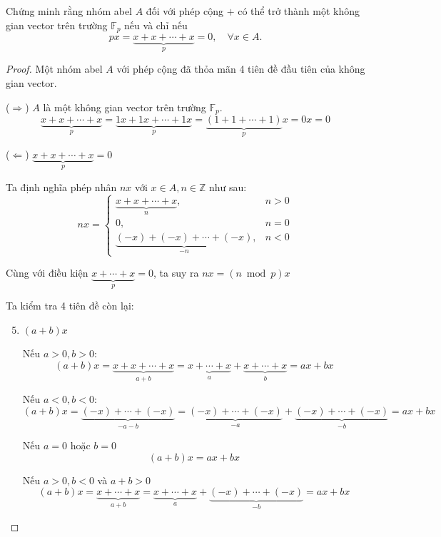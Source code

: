 \documentclass[class=linear-algebra,crop=false]{standalone}
\begin{document}
\begin{exercise}Chứng minh rằng nhóm abel $A$ đối với phép cộng $+$ có thể trở thành một không gian vector trên trường $\mathbb{F}_{p}$ nếu và chỉ nếu
    \[ px = \underbrace{x + x + \cdots + x}_{p} = 0,\quad \forall x\in A. \]
\end{exercise}

\begin{proof}Một nhóm abel $A$ với phép cộng đã thỏa mãn 4 tiên đề đầu tiên của không gian vector.
    \par($\Rightarrow$) $A$ là một không gian vector trên trường $\mathbb{F}_{p}$.
    \[ \underbrace{x + x + \cdots + x}_{p} = \underbrace{1x + 1x + \cdots + 1x}_{p} = \underbrace{(1 + 1 + \cdots + 1)}_{p}x = 0x = 0 \]
    \par($\Leftarrow$) $\underbrace{x + x + \cdots + x}_{p} = 0$
    \par Ta định nghĩa phép nhân $nx$ với $x\in A, n\in\mathbb{Z}$ như sau:
    \[
        nx =
        \begin{cases}
            \underbrace{x + x + \cdots + x}_{n},           & n > 0 \\
            0,                                             & n = 0 \\
            \underbrace{(-x) + (-x) + \cdots + (-x)}_{-n}, & n < 0
        \end{cases}
    \]
    \par Cùng với điều kiện $\underbrace{x + \cdots + x}_{p} = 0$, ta suy ra $nx = (n\bmod{p})x$
    \par Ta kiểm tra 4 tiên đề còn lại:
    \begin{enumerate}[label= (V\arabic*)]
        \setcounter{enumi}{4}
        \item $(a + b)x$
              \par Nếu $a > 0, b > 0$:
              \[ (a + b)x = \underbrace{x + x + \cdots + x}_{a+b} = \underbrace{x + \cdots + x}_{a} + \underbrace{x + \cdots + x}_{b} = ax + bx \]
              \par Nếu $a < 0, b < 0$:
              \[ (a + b)x = \underbrace{(-x) + \cdots + (-x)}_{-a-b} = \underbrace{(-x) + \cdots + (-x)}_{-a} + \underbrace{(-x) + \cdots + (-x)}_{-b} = ax + bx \]
              \par Nếu $a = 0$ hoặc $b = 0$
              \[ (a + b)x = ax + bx \]
              \par Nếu $a > 0, b < 0$ và $a + b > 0$
              \[ (a + b)x = \underbrace{x + \cdots + x}_{a+b} = \underbrace{x + \cdots + x}_{a} + \underbrace{(-x) + \cdots + (-x)}_{-b} = ax + bx \]

\end{enumerate}
\end{proof}
\end{document}
